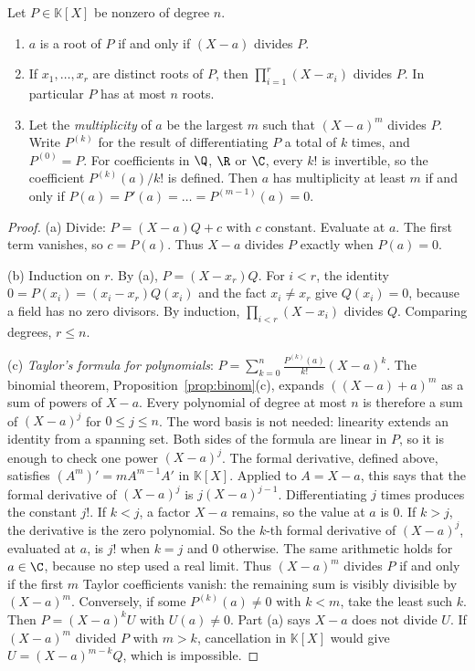 \begin{proposition}[roots]\label{prop:rootsfactor}
Let $P\in\mathbb K[X]$ be nonzero of degree $n$.
\begin{enumerate}[label=(\alph*)]
\item $a$ is a root of $P$ if and only if $(X-a)$ divides $P$.
\item If $x_1,\dots,x_r$ are distinct roots of $P$, then $\prod_{i=1}^r(X-x_i)$ divides $P$. In particular $P$ has at most $n$ roots.
\item Let the \emph{multiplicity} of $a$ be the largest $m$ such that $(X-a)^m$ divides $P$. Write $P^{(k)}$ for the result of differentiating $P$ a total of $k$ times, and $P^{(0)}=P$. For coefficients in $\Q$, $\R$ or $\C$, every $k!$ is invertible, so the coefficient $P^{(k)}(a)/k!$ is defined. Then $a$ has multiplicity at least $m$ if and only if $P(a)=P'(a)=\dots=P^{(m-1)}(a)=0$.
\end{enumerate}
\end{proposition}
\begin{proof}
(a) Divide: $P=(X-a)Q+c$ with $c$ constant. Evaluate at $a$. The first term vanishes, so $c=P(a)$. Thus $X-a$ divides $P$ exactly when $P(a)=0$.

(b) Induction on $r$. By (a), $P=(X-x_r)Q$. For $i<r$, the identity $0=P(x_i)=(x_i-x_r)Q(x_i)$ and the fact $x_i\ne x_r$ give $Q(x_i)=0$, because a field has no zero divisors. By induction, $\prod_{i<r}(X-x_i)$ divides $Q$. Comparing degrees, $r\le n$.

(c) \emph{Taylor's formula for polynomials}: $P=\sum_{k=0}^n\frac{P^{(k)}(a)}{k!}(X-a)^k$. The binomial theorem, Proposition~\ref{prop:binom}(c), expands $((X-a)+a)^m$ as a sum of powers of $X-a$. Every polynomial of degree at most $n$ is therefore a sum of $(X-a)^j$ for $0\le j\le n$. The word basis is not needed: linearity extends an identity from a spanning set. Both sides of the formula are linear in $P$, so it is enough to check one power $(X-a)^j$. The formal derivative, defined above, satisfies $(A^m)'=mA^{m-1}A'$ in $\mathbb K[X]$. Applied to $A=X-a$, this says that the formal derivative of $(X-a)^j$ is $j(X-a)^{j-1}$. Differentiating $j$ times produces the constant $j!$. If $k<j$, a factor $X-a$ remains, so the value at $a$ is $0$. If $k>j$, the derivative is the zero polynomial. So the $k$-th formal derivative of $(X-a)^j$, evaluated at $a$, is $j!$ when $k=j$ and $0$ otherwise. The same arithmetic holds for $a\in\C$, because no step used a real limit. Thus $(X-a)^m$ divides $P$ if and only if the first $m$ Taylor coefficients vanish: the remaining sum is visibly divisible by $(X-a)^m$. Conversely, if some $P^{(k)}(a)\ne0$ with $k<m$, take the least such $k$. Then $P=(X-a)^kU$ with $U(a)\ne0$. Part (a) says $X-a$ does not divide $U$. If $(X-a)^m$ divided $P$ with $m>k$, cancellation in $\mathbb K[X]$ would give $U=(X-a)^{m-k}Q$, which is impossible.
\end{proof}

